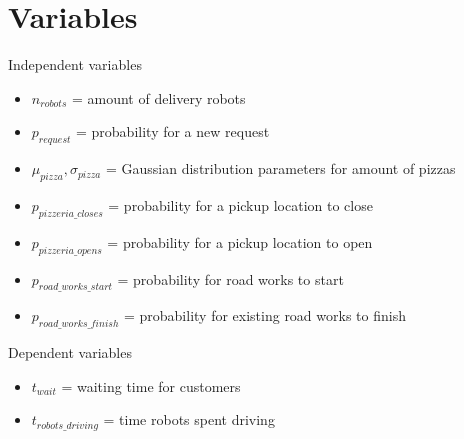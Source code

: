 \section{Variables}

\begin{frame}{Independent variables}
    \begin{itemize}
        \item $n_{robots}$ = amount of delivery robots
        \item $p_{request}$ = probability for a new request
        \item $\mu_{pizza}, \sigma_{pizza}$ = Gaussian distribution parameters for amount of pizzas
        \item $p_{pizzeria\_closes}$ = probability for a pickup location to close
        \item $p_{pizzeria\_opens}$  = probability for a pickup location to open
        \item $p_{road\_works\_start}$ = probability for road works to start
        \item $p_{road\_works\_finish}$ = probability for existing road works to finish
    \end{itemize}
\end{frame}

\begin{frame}{Dependent variables}
    \begin{itemize}
        \item $t_{wait}$ = waiting time for customers
        \item $t_{robots\_driving}$ = time robots spent driving
    \end{itemize}
\end{frame}

